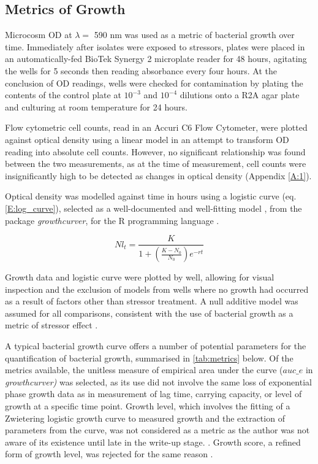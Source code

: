 \documentclass[10pt]{article}
\begin{document}
\subsection{Metrics of Growth}
\label{S:2:4}

Microcosm OD at $\lambda =$ 590 nm was used as a metric of bacterial growth over time. Immediately after isolates were exposed to stressors, plates were placed in an automatically-fed BioTek Synergy 2 microplate reader for 48 hours, agitating the wells for 5 seconds then reading absorbance every four hours.  At the conclusion of OD readings, wells were checked for contamination by plating the contents of the control plate at $10^{-3}$ and $10^{-4}$ dilutions onto a R2A agar plate and culturing at room temperature for 24 hours.

Flow cytometric cell counts, read in an Accuri C6 Flow Cytometer, were plotted against optical density using a linear model in an attempt to transform OD reading into absolute cell counts. However, no significant relationship was found between the two measurements, as at the time of measurement, cell counts were insignificantly high to be detected as changes in optical density (Appendix \ref{A:1}). 

Optical density was modelled against time in hours using a logistic curve (eq. \ref{E:log_curve}), selected as a well-documented and well-fitting model \cite{Zwietering1990}, from the package \textit{growthcurver}, \cite{Sprouffske2016Package} for the R programming language \cite{RCoreTeam2018}.

\begin{equation}
Nl_t=\frac{K}{1 + (\frac{K - N_0}{N_0}) e^{-rt}}
\label{E:log_curve}
\end{equation}

Growth data and logistic curve were plotted by well, allowing for visual inspection and the exclusion of models from wells where no growth had occurred as a result of factors other than stressor treatment. A null additive model was assumed for all comparisons, consistent with the use of bacterial growth as a metric of stressor effect \cite{Piggott2015}. 

A typical bacterial growth curve \cite{Monod1949} offers a number of potential parameters for the quantification of bacterial growth, summarised in \cref{tab:metrics} below. Of the metrics available, the unitless measure of empirical area under the curve ($auc\_e$ in \textit{growthcurver)} was selected, as its use did not involve the same loss of exponential phase growth data as in measurement of lag time, carrying capacity, or level of growth at a specific time point. Growth level, which involves the fitting of a Zwietering logistic growth curve to measured growth and the extraction of parameters from the curve, was not considered as a metric as the author was not aware of its existence until late in the write-up stage. \cite{Cuevas2017}. Growth score, a refined form of growth level, was rejected for the same reason \cite{Cuevas2018}.
\end{document}

